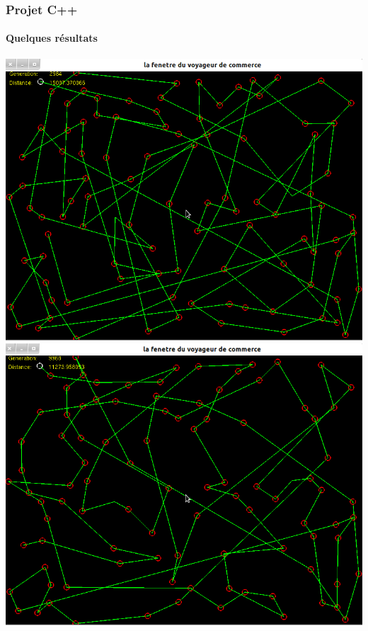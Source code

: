 \documentclass{beamer}
\begin{document}
	\begin{frame}
	\frametitle{Projet C++}
	\framesubtitle{Quelques résultats}
	
	\includegraphics[scale=0.2]{3.png}
	\includegraphics[scale=0.2]{4.png}
			
	\end{frame}		
	
\end{document}
